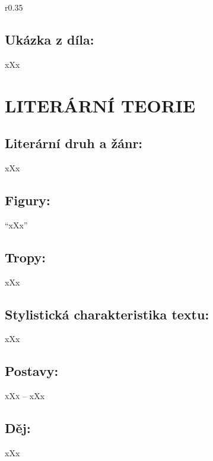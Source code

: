 \documentclass{extarticle} %
\begin{document}
\noindent\begin{wrapfigure}{r}{0.35\textwidth}
\tiny

\subsection*{Ukázka z díla:}
\setlength{\parindent}{3pt}
xXx
\end{wrapfigure}

\section*{LITERÁRNÍ TEORIE}

\subsection*{Literární druh a žánr:}
\noindent xXx



\subsection*{Figury:}
\noindent 
\enquote{xXx}

\subsection*{Tropy:}
\noindent 
xXx

\subsection*{Stylistická charakteristika textu:}
\noindent 
xXx

\subsection*{Postavy:}
\noindent 
\textsc{xXx --} xXx \\

\subsection*{Děj:}
\noindent 
xXx
\end{document}
